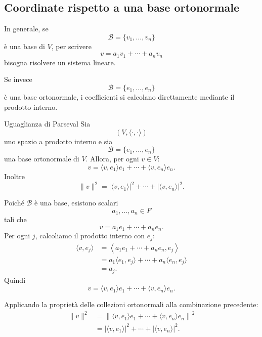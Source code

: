 \documentclass[a4paper]{article}
\begin{document}
\subsection{Coordinate rispetto a una base ortonormale}

In generale, se
\[
    \mathcal{B}=\{v_1,\ldots,v_n\}
\]
è una base di \(V\), per scrivere
\[
    v=a_1v_1+\cdots+a_nv_n
\]
bisogna risolvere un sistema lineare.

Se invece
\[
    \mathcal{B}=\{e_1,\ldots,e_n\}
\]
è una base ortonormale, i coefficienti si calcolano direttamente mediante il prodotto interno.

\begin{snippetproposition}{Uguaglianza di Parseval}
    Sia
    \[
        (V,\langle\cdot,\cdot\rangle)
    \]
    uno spazio a prodotto interno e sia
    \[
        \mathcal{B}=\{e_1,\ldots,e_n\}
    \]
    una base ortonormale di \(V\). Allora, per ogni \(v\in V\):
    \[
        v
        =
        \langle v,e_1\rangle e_1
        +\cdots+
        \langle v,e_n\rangle e_n.
    \]
    Inoltre
    \[
        \|v\|^2
        =
        |\langle v,e_1\rangle|^2
        +\cdots+
        |\langle v,e_n\rangle|^2.
    \]
\end{snippetproposition}

\begin{snippetproof}{}
    Poiché \(\mathcal{B}\) è una base, esistono scalari
    \[
        a_1,\ldots,a_n\in F
    \]
    tali che
    \[
        v=a_1e_1+\cdots+a_ne_n.
    \]
    Per ogni \(j\), calcoliamo il prodotto interno con \(e_j\):
    \begin{align*}
        \langle v,e_j\rangle
        &=
        \left\langle
        a_1e_1+\cdots+a_ne_n,
        e_j
        \right\rangle\\
        &=
        a_1\langle e_1,e_j\rangle+\cdots+a_n\langle e_n,e_j\rangle\\
        &=
        a_j.
    \end{align*}
    Quindi
    \[
        v
        =
        \langle v,e_1\rangle e_1
        +\cdots+
        \langle v,e_n\rangle e_n.
    \]

    Applicando la proprietà delle collezioni ortonormali alla combinazione precedente:
    \begin{align*}
        \|v\|^2
        &=
        \left\|
        \langle v,e_1\rangle e_1
        +\cdots+
        \langle v,e_n\rangle e_n
        \right\|^2\\
        &=
        |\langle v,e_1\rangle|^2
        +\cdots+
        |\langle v,e_n\rangle|^2.
    \end{align*}
\end{snippetproof}
\end{document}
